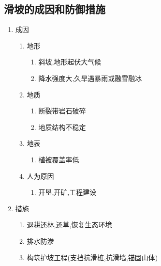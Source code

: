 \documentclass[a4paper]{article}
\begin{document}
    \subsection{滑坡的成因和防御措施}
    \begin{enumerate}
        \item 成因
        \begin{enumerate}
            \item 地形
            \begin{enumerate}
                \item 斜坡,地形起伏大气候
                \item 降水强度大,久旱遇暴雨或融雪融冰
            \end{enumerate}
            \item 地质
            \begin{enumerate}
                \item 断裂带岩石破碎
                \item 地质结构不稳定
            \end{enumerate}
            \item 地表
            \begin{enumerate}
                \item 植被覆盖率低
            \end{enumerate}
            \item 人为原因
            \begin{enumerate}
                \item 开垦,开矿,工程建设
            \end{enumerate}
        \end{enumerate}
        \item 措施
        \begin{enumerate}
            \item 退耕还林,还草,恢复生态环境
            \item 排水防渗
            \item 构筑护坡工程(支挡抗滑桩,抗滑墙,锚固山体)
        \end{enumerate}
    \end{enumerate}
\end{document}
